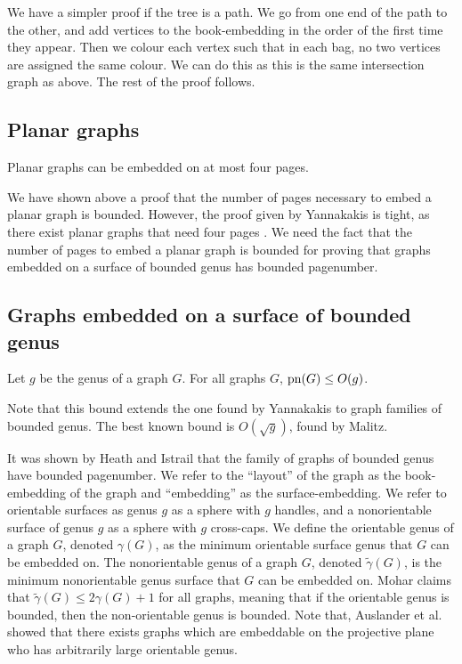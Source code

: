 We have a simpler proof if the tree is a path. We go from one end of the path to the other, and add vertices to the book-embedding in the order of the first time they appear. Then we colour each vertex such that in each bag, no two vertices are assigned the same colour. We can do this as this is the same intersection graph as above. The rest of the proof follows.

\subsection{Planar graphs}\label{ssec:Planar_Graphs}
\begin{theorem} \label{thm:4Pages_Planar}
	Planar graphs can be embedded on at most four pages.
\end{theorem}
We have shown above a proof that the number of pages necessary to embed a planar graph is bounded. However, the proof given by Yannakakis is tight, as there exist planar graphs that need four pages \cite{yannakakisPlanarGraphsThat2020} \cite{kaufmannFourPagesAre2020}. We need the fact that the number of pages to embed a planar graph is bounded for proving that graphs embedded on a surface of bounded genus has bounded pagenumber. 

\subsection{Graphs embedded on a surface of bounded genus}\label{ssec:pagenumber_bounded_genus}
\begin{theorem}\label{thm:Genus_pagenumber_bound}
	Let \(g\) be the genus of a graph \(G\). For all graphs \(G\), \(\operatorname{pn}(G) \leq O(g)\).
\end{theorem}
Note that this bound extends the one found by Yannakakis \cite{yannakakisEmbeddingPlanarGraphs1989} to graph families of bounded genus. 
The best known bound is \(O(\sqrt{g})\), found by Malitz\cite{malitzGenusGraphsHave1994}.

It was shown by Heath and Istrail that the family of graphs of bounded genus have bounded pagenumber. 
We refer to the ``layout'' of the graph as the book-embedding of the graph and ``embedding'' as the surface-embedding. We refer to orientable surfaces as genus \(g\) as a sphere with \(g\) handles, and a nonorientable surface of genus \(g\) as a sphere with \(g\) cross-caps. We define the orientable genus of a graph \(G\), denoted \(\gamma(G)\), as the minimum orientable surface genus that \(G\) can be embedded on. The nonorientable genus of a graph \(G\), denoted \(\tilde{\gamma}(G)\), is the minimum nonorientable genus surface that \(G\) can be embedded on. Mohar\cite{moharOrientableGenusGraphs1998} claims that \(\tilde{\gamma}(G) \leq 2 \gamma(G) + 1\) for all graphs, meaning that if the orientable genus is bounded, then the non-orientable genus is bounded. Note that, Auslander et al.\cite{auslanderImbeddingGraphsManifolds1963} showed that there exists graphs which are embeddable on the projective plane who has arbitrarily large orientable genus. 
